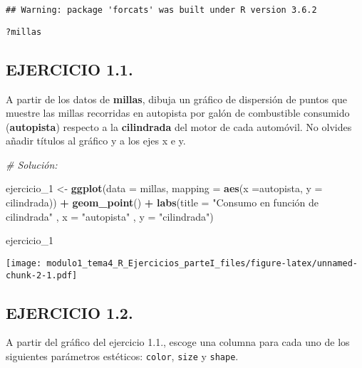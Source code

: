 \documentclass[]{article}
\newenvironment{Shaded}{\begin{snugshade}}{\end{snugshade}}
\newcommand{\CommentTok}[1]{\textcolor[rgb]{0.56,0.35,0.01}{\textit{#1}}}
\newcommand{\DataTypeTok}[1]{\textcolor[rgb]{0.13,0.29,0.53}{#1}}
\newcommand{\DecValTok}[1]{\textcolor[rgb]{0.00,0.00,0.81}{#1}}
\newcommand{\KeywordTok}[1]{\textcolor[rgb]{0.13,0.29,0.53}{\textbf{#1}}}
\newcommand{\NormalTok}[1]{#1}
\newcommand{\OperatorTok}[1]{\textcolor[rgb]{0.81,0.36,0.00}{\textbf{#1}}}
\newcommand{\StringTok}[1]{\textcolor[rgb]{0.31,0.60,0.02}{#1}}
\begin{document}
\begin{verbatim}
## Warning: package 'forcats' was built under R version 3.6.2
\end{verbatim}

\begin{verbatim}
?millas
\end{verbatim}

\hypertarget{ejercicio-1.1.}{%
\subsection{EJERCICIO 1.1.}\label{ejercicio-1.1.}}

A partir de los datos de \textbf{millas}, dibuja un gráfico de
dispersión de puntos que muestre las millas recorridas en autopista por
galón de combustible consumido (\textbf{autopista}) respecto a la
\textbf{cilindrada} del motor de cada automóvil. No olvides añadir
títulos al gráfico y a los ejes x e y.

\begin{Shaded}
\begin{Highlighting}[]
\CommentTok{# Solución:}

\NormalTok{ejercicio_}\DecValTok{1}\NormalTok{ <-}\StringTok{ }\KeywordTok{ggplot}\NormalTok{(}\DataTypeTok{data =}\NormalTok{ millas, }\DataTypeTok{mapping =} \KeywordTok{aes}\NormalTok{(}\DataTypeTok{x =}\NormalTok{autopista, }\DataTypeTok{y =}\NormalTok{ cilindrada)) }\OperatorTok{+}\StringTok{ }
\StringTok{  }\KeywordTok{geom_point}\NormalTok{() }\OperatorTok{+}
\StringTok{  }\KeywordTok{labs}\NormalTok{(}\DataTypeTok{title =} \StringTok{"Consumo en función de cilindrada"}
\NormalTok{       , }\DataTypeTok{x =} \StringTok{"autopista"}
\NormalTok{       , }\DataTypeTok{y =} \StringTok{"cilindrada"}\NormalTok{)}
  
\NormalTok{ejercicio_}\DecValTok{1}
\end{Highlighting}
\end{Shaded}

\texttt{[image: modulo1\_tema4\_R\_Ejercicios\_parteI\_files/figure-latex/unnamed-chunk-2-1.pdf]}

\hypertarget{ejercicio-1.2.}{%
\subsection{EJERCICIO 1.2.}\label{ejercicio-1.2.}}

A partir del gráfico del ejercicio 1.1., escoge una columna para cada
uno de los siguientes parámetros estéticos: \texttt{color},
\texttt{size} y \texttt{shape}.
\end{document}
